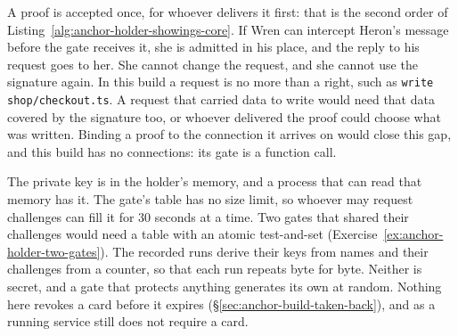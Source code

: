 \begin{pdboundary}
\setlength{\parskip}{4pt plus 1pt}
A proof is accepted once, for whoever delivers it first: that is the second
order of Listing~\ref{alg:anchor-holder-showings-core}. If Wren can
intercept Heron's message before the gate receives it, she is admitted
in his place, and the reply to his request goes to her. She cannot change
the request, and she cannot use the signature again. In this build a request
is no more than a right, such as \texttt{write shop/checkout.ts}. A
request that carried data to write would need that data covered by the
signature too, or whoever delivered the proof could choose what was
written. Binding a proof to the connection it arrives on would close this
gap, and this build has no connections: its gate is a function call.

The private key is in the holder's memory, and a process that can read
that memory has it. The gate's table has no size limit, so whoever may
request challenges can fill it for 30 seconds at a time. Two gates that
shared their challenges would need a table with an atomic test-and-set
(Exercise~\ref{ex:anchor-holder-two-gates}). The recorded runs derive their
keys from names and their challenges from a counter, so that each run
repeats byte for byte. Neither is secret, and a gate that protects
anything generates its own at random. Nothing here revokes a card before it
expires (\S\ref{sec:anchor-build-taken-back}), and \pdkernelname{} as a
running service still does not require a card.
\end{pdboundary}
